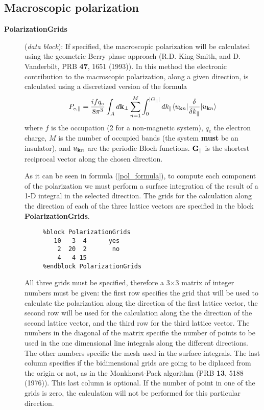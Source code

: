 \documentclass[11pt]{article}
\begin{document}
\vspace{5pt}
\subsection{Macroscopic polarization}

\begin{description}

\item[{\bf PolarizationGrids}] ({\it data block}):
If specified, the macroscopic polarization will be calculated using the
geometric Berry phase approach (R.D. King-Smith, and D. Vanderbilt,
PRB {\bf 47}, 1651 (1993)). In this method the electronic 
contribution to the macroscopic polarization, along a given direction, 
is calculated using
a discretized version of the formula
\begin{equation}
\label{pol_formula}
    P_{e,\parallel}={ifq_e \over 8\pi^3} \int_A d{\bf k}_\perp
    \sum_{n=1}^M \int_0^{|G_\parallel|} dk_{\parallel}
     \langle u_{{\bf k} n} |{\delta \over \delta k_{\parallel}} |
      u_{{\bf k} n} \rangle
\end{equation}
where $f$ is the occupation (2 for a non-magnetic system), 
$q_e$ the electron charge, $M$ is the number of occupied bands (the
system {\bf must} be an insulator), and $u_{{\bf k} n}$ are
the periodic Bloch functions. ${\bf G}_\parallel$ is the shortest
reciprocal vector along the chosen direction. 

As it can be seen in formula (\ref{pol_formula}), to compute each 
component of the polarization we must perform a surface integration
of the result of a 1-D integral in the selected direction. 
The grids for the calculation along the direction of each of the
three lattice vectors are specified in the block
{\bf PolarizationGrids}. 
\begin{verbatim}
     %block PolarizationGrids
        10   3  4      yes
         2  20  2       no
         4   4 15
     %endblock PolarizationGrids
\end{verbatim}      

All three grids must be specified, therefore a 3$\times$3 matrix of
integer numbers must be given: the first row specifies the grid that
will be used to calculate the polarization along the direction of the
first lattice vector, the second row will be used for the calculation
along the the direction of the second lattice vector, and the third
row for the third lattice vector.  The numbers in the diagonal of the
matrix specifie the number of points to be used in the one dimensional
line integrals along the different directions. The other numbers
specifie the mesh used in the surface integrals.  The last column
specifies if the bidimensional grids are going to be diplaced from the
origin or not, as in the Monkhorst-Pack algorithm (PRB {\bf 13}, 5188
(1976)).  This last column is optional.  If the number of point in one
of the grids is zero, the calculation will not be performed for this
particular direction.


\end{description}
\end{document}
